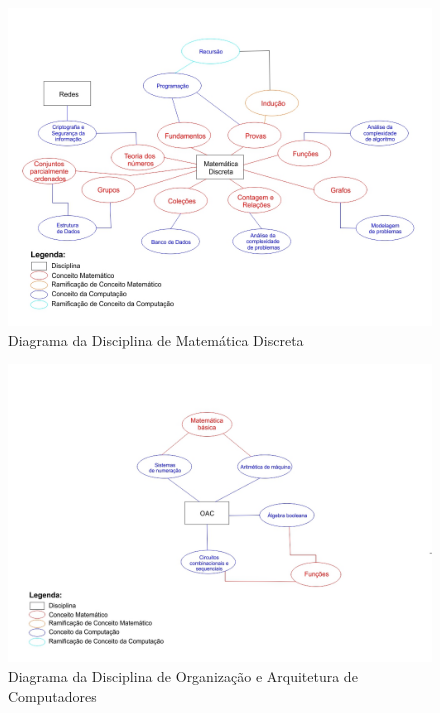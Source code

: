 \documentclass[12pt,a4paper]{article}
\begin{document}
\begin{figure}[!h]
	\centering
	\includegraphics[scale=0.4]{imagens/MD.jpg} 
	\caption{Diagrama da Disciplina de Matemática Discreta}
\end{figure}

\begin{figure}[!h]
	\centering
	\includegraphics[scale=0.4]{imagens/OAC.jpg} 
	\caption{Diagrama da Disciplina de Organização e Arquitetura de Computadores}
\end{figure}
\end{document}
